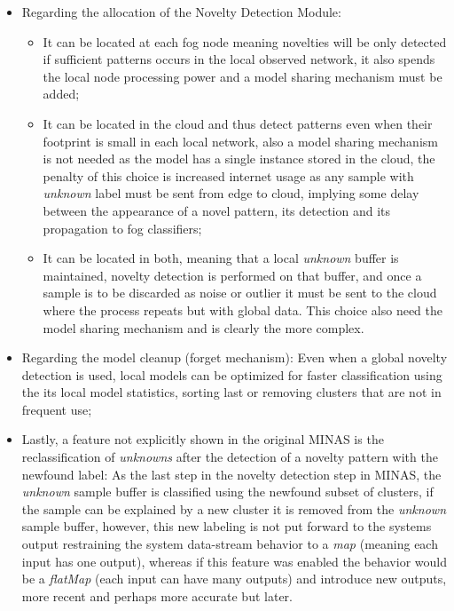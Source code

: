 \begin{itemize}
    \item Regarding the allocation of the Novelty Detection Module:
    \begin{itemize}
        \item 
        It can be located at each fog node meaning novelties will be only
        detected if sufficient patterns occurs in the local observed network,
        it also spends the local node processing power and a model sharing mechanism 
        must be added;
        \item It can be located in the cloud and thus detect patterns even when
        their footprint is small in each local network, also a model sharing mechanism
        is not needed as the model has a single instance stored in the cloud,
        the penalty of this choice is increased internet usage as any sample with
        \emph{unknown} label must be sent from edge to cloud, implying some delay
        between the appearance of a novel pattern, its detection and its propagation
        to fog classifiers;
        \item It can be located in both, meaning that a local \emph{unknown} buffer
        is maintained, novelty detection is performed on that buffer, and once
        a sample is to be discarded as noise or outlier it must be sent to the cloud
        where the process repeats but with global data. This choice also need the model
        sharing mechanism and is clearly the more complex.
    \end{itemize}
    \item Regarding the model cleanup (forget mechanism):
    Even when a global novelty detection is used, local models can be optimized for faster
    classification using the its local model statistics, sorting last or removing clusters that
    are not in frequent use;
    \item Lastly, a feature not explicitly shown in the original MINAS is the reclassification
    of \emph{unknowns} after the detection of a novelty pattern with the newfound label:
    As the last step in the novelty detection step in MINAS, the \emph{unknown} sample buffer is
    classified using the newfound subset of clusters, if the sample can be explained by a new cluster
    it is removed from the \emph{unknown} sample buffer, however, this new labeling is not put forward
    to the systems output restraining the system data-stream behavior to a \emph{map} (meaning each input
    has one output), whereas if this feature was enabled the behavior would be a \emph{flatMap} (each input
    can have many outputs) and introduce new outputs, more recent and perhaps more accurate but later.
\end{itemize}

